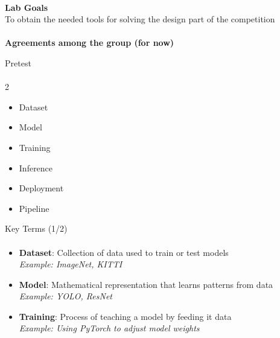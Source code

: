 \documentclass[aspectratio=169]{beamer}
\begin{document}
\begin{frame}[c]{}
    \framesubtitle{}
    \centering \LARGE \textbf{Lab Goals} \\
    To obtain the needed tools for solving the design part of the competition
\end{frame}

\begin{frame}[c]{}
    \framesubtitle{}
    \centering\LARGE
    \textbf{Agreements among the group (for now)}
\end{frame}

\begin{frame}[t]{Pretest}
    \framesubtitle{}
    \LARGE
    \begin{multicols}{2}
        \begin{itemize}
            \item Dataset
            \item Model
            \item Training
            \item Inference
            \item Deployment
            \item Pipeline
        \end{itemize}
    \end{multicols}
\end{frame}

\begin{frame}[t]{Key Terms (1/2)}
    \framesubtitle{}
    \begin{itemize}
        \item \textbf{Dataset}: Collection of data used to train or test models
        \\ \textit{Example: ImageNet, KITTI}
        
        \item \textbf{Model}: Mathematical representation that learns patterns from data
        \\ \textit{Example: YOLO, ResNet}
        
        \item \textbf{Training}: Process of teaching a model by feeding it data
        \\ \textit{Example: Using PyTorch to adjust model weights}
    \end{itemize}
\end{frame}
\end{document}
